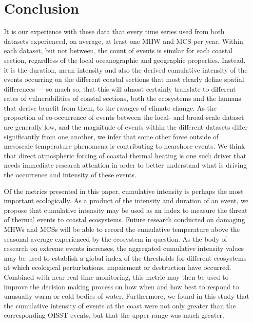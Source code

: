 \documentclass[a4paper,10pt,review]{elsarticle}
\begin{document}
\section{Conclusion}
It is our experience with these data that every time series used from both datasets experienced, on average, at least one MHW and MCS per year. Within each dataset, but not between, the count of events is similar for each coastal section, regardless of the local oceanographic and geographic properties. Instead, it is the duration, mean intensity and also the derived cumulative intensity of the events occurring on the different coastal sections that most clearly define spatial differences --- so much so, that this will almost certainly translate to different rates of vulnerabilities of coastal sections, both the ecosystems and the humans that derive benefit from them, to the ravages of climate change. As the proportion of co-occurrence of events between the local- and broad-scale dataset are generally low, and the magnitude of events within the different datasets differ significantly from one another, we infer that some other force outside of mesoscale temperature phenomena is contributing to nearshore events. We think that direct atmospheric forcing of coastal thermal heating is one such driver that needs immediate research attention in order to better understand what is driving the occurrence and intensity of these events.

Of the metrics presented in this paper, cumulative intensity is perhaps the most important ecologically. As a product of the intensity and duration of an event, we propose that cumulative intensity may be used as an index to measure the threat of thermal events to coastal ecosystems. Future research conducted on damaging MHWs and MCSs will be able to record the cumulative temperature above the seasonal average experienced by the ecosystem in question. As the body of research on extreme events increases, the aggregated cumulative intensity values may be used to establish a global index of the thresholds for different ecosystems at which ecological perturbations, impairment or destruction have occurred. Combined with near real time monitoring, this metric may then be used to improve the decision making process on how when and how best to respond to unusually warm or cold bodies of water. Furthermore, we found in this study that the cumulative intensity of events at the coast were not only greater than the corresponding OISST events, but that the upper range was much greater.
\end{document}
